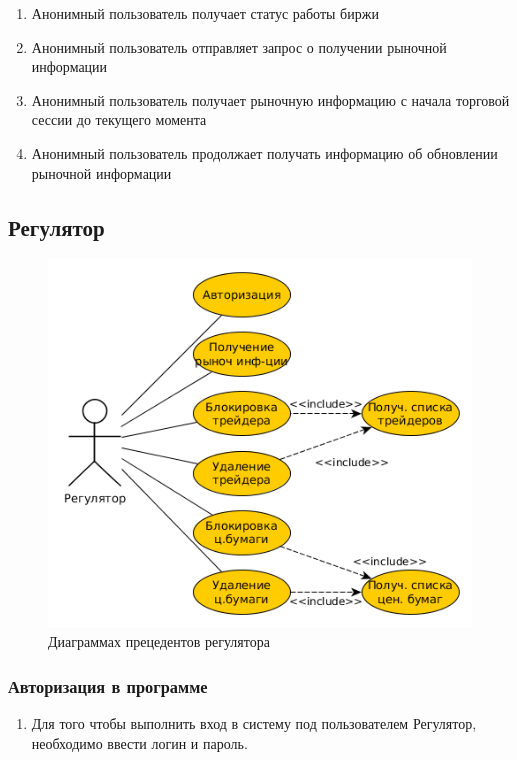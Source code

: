 \documentclass[a4paper, 12pt]{article}        %
\begin{document}
\begin{enumerate}
\item Анонимный пользователь получает статус работы биржи
\item Анонимный пользователь отправляет запрос о получении рыночной информации
\item Анонимный пользователь получает рыночную информацию с начала торговой сессии до текущего момента
\item Анонимный пользователь продолжает получать информацию об обновлении рыночной информации
\end{enumerate}

\subsection{Регулятор}

\begin{figure}[H]
\centering
\includegraphics[scale=1]{res/pic04}
\caption{Диаграммах прецедентов регулятора}
\end{figure}

\subsubsection{Авторизация в программе}

\begin{enumerate}
\item Для того чтобы выполнить вход в систему под пользователем Регулятор, необходимо ввести логин и пароль.
\end{enumerate}
\end{document}
